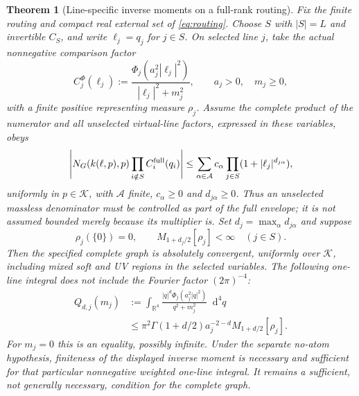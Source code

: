 \documentclass[final,5p,times,twocolumn,numbers,nopreprintline]{elsarticle}
\numberwithin{equation}{section}
\newtheorem{theorem}{Theorem}[section]
\theoremstyle{definition}
\theoremstyle{remark}
\newcommand{\dd}{\mathop{}\!\mathrm d}
\newcommand{\Ph}{\Phi}
\newcommand{\RR}{\mathbb R}
\begin{document}
\begin{theorem}[Line-specific inverse moments on a full-rank routing]
\label{thm:optimized-selected-lines}
Fix the finite routing and compact real external set of
\eqref{eq:routing}. Choose $S$ with $|S|=L$ and invertible $C_S$, and
write $\ell_j=q_j$ for $j\in S$. On selected line $j$, take the actual
nonnegative comparison factor
\begin{equation}
 C_j^{\Ph}(\ell_j)
  :=\frac{\Ph_j(a_j^2|\ell_j|^2)}{|\ell_j|^2+m_j^2},
 \qquad a_j>0,\quad m_j\geq0,
 \label{eq:optimized-selected-factor}
\end{equation}
with a finite positive representing measure $\rho_j$.
Assume the \emph{complete product} of the numerator and all
unselected virtual-line factors, expressed in these variables, obeys
\begin{equation}
 \left|N_G(k(\ell,p),p)\prod_{i\notin S} C_i^{\rm full}(q_i)\right|
 \leq\sum_{\alpha\in\mathcal A}c_\alpha
       \prod_{j\in S}(1+|\ell_j|^{d_{j\alpha}}),
 \label{eq:anisotropic-complete-envelope}
\end{equation}
uniformly in $p\in\mathcal K$, with $\mathcal A$ finite,
$c_\alpha\geq0$ and $d_{j\alpha}\geq0$. Thus an unselected
massless denominator must be controlled as part of the \emph{full}
envelope; it is not assumed bounded merely because its multiplier is.
Set $d_j=\max_\alpha d_{j\alpha}$ and suppose
\begin{equation}
 \rho_j(\{0\})=0,\qquad
 M_{1+d_j/2}[\rho_j]<\infty\quad(j\in S).
 \label{eq:optimized-moment-budget}
\end{equation}
Then the specified complete graph is absolutely convergent,
uniformly over $\mathcal K$, including mixed soft and UV regions
in the selected variables. The following one-line integral does
\emph{not} include the Fourier factor $(2\pi)^{-4}$:
\begin{equation}
 \begin{aligned}
 Q_{d,j}(m_j)
  &:=\int_{\RR^4}\frac{|q|^d\Ph_j(a_j^2|q|^2)}{q^2+m_j^2}
         \dd^4q\\
  &\leq\pi^2\Gamma(1+d/2)a_j^{-2-d}
          M_{1+d/2}[\rho_j].
 \end{aligned}
 \label{eq:optimized-one-line-moment}
\end{equation}
For $m_j=0$ this is an equality, possibly infinite. Under the
\emph{separate no-atom hypothesis}, finiteness of the displayed
inverse moment is necessary and sufficient for that particular
nonnegative weighted one-line integral. It remains a sufficient,
not generally necessary, condition for the complete graph.
\end{theorem}
\end{document}
